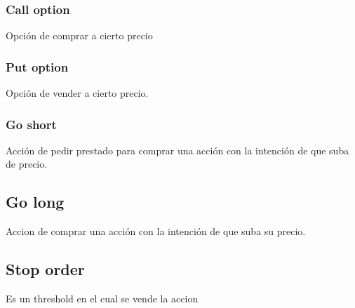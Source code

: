             \subsubsection{ Call option }
        
                Opción de comprar a cierto precio
        
            \subsubsection{ Put option }
        
                Opción de vender a cierto precio.
        
            \subsubsection{ Go short }
        
                Acción de pedir prestado para comprar una acción con la intención de que suba de precio.
        
        \subsection{ Go long }
        
            Accion de comprar una acción con la intención de que suba su precio.
        
        \subsection{ Stop order }
        
            Es un threshold en el cual se vende la accion
            
        

\blindtext